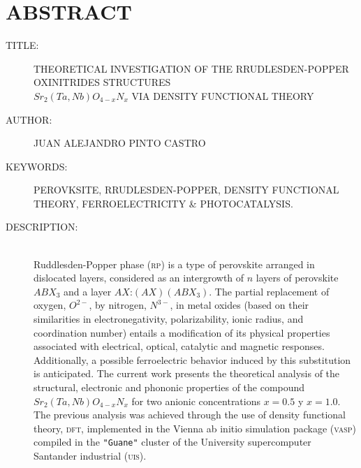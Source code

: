 \chapter*{ABSTRACT}

\footnotesize{
\begin{description}
  \item[TITLE:] THEORETICAL INVESTIGATION OF THE RRUDLESDEN-POPPER OXINITRIDES STRUCTURES\\ $Sr_{2}(Ta,Nb)O_{4-x}N_{x}$ VIA DENSITY FUNCTIONAL THEORY 
  \item[AUTHOR:] JUAN ALEJANDRO PINTO CASTRO
  \item[KEYWORDS:] PEROVKSITE, RRUDLESDEN-POPPER, DENSITY FUNCTIONAL THEORY, FERROELECTRICITY \& PHOTOCATALYSIS.
  \item[DESCRIPTION:]\hfill \\ Ruddlesden-Popper phase (\textsc{rp}) is a type of perovskite arranged in dislocated layers, considered as an intergrowth of $n$  layers of perovskite $ABX_{3}$ and a layer $AX$:$(AX)(ABX_{3})$.
  The partial replacement of oxygen, $O^{2-}$, by nitrogen, $N^{3-}$, in metal oxides (based on their similarities in electronegativity, polarizability, ionic radius, and coordination number) entails a modification of its physical properties associated with electrical, optical, catalytic and magnetic responses. Additionally, a possible ferroelectric behavior induced by this substitution is anticipated.
  The current work presents the theoretical analysis of the structural, electronic and phononic properties of the compound $Sr_{2}(Ta,Nb)O_{4-x}N_{x}$ for two anionic concentrations $x=0.5$ y $x=1.0$. The previous analysis was achieved through the use of density functional theory, \textsc{dft}, implemented in the Vienna ab initio simulation package (\textsc{vasp}) compiled in the \texttt{"Guane"} cluster of the University supercomputer Santander industrial (\textsc{uis}).
  

\end{description}}
